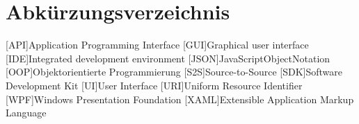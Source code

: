 \chapter{Abkürzungsverzeichnis}
\begin{acronym}[XAML]
[API]{Application Programming Interface}
[GUI]{Graphical user interface}
[IDE]{Integrated development environment}
[JSON]{JavaScriptObjectNotation}
[OOP]{Objektorientierte Programmierung}
[S2S]{Source-to-Source}
[SDK]{Software Development Kit}
[UI]{User Interface}
[URI]{Uniform Resource Identifier}
[WPF]{Windows Presentation Foundation}
[XAML]{Extensible Application Markup Language}

\end{acronym}